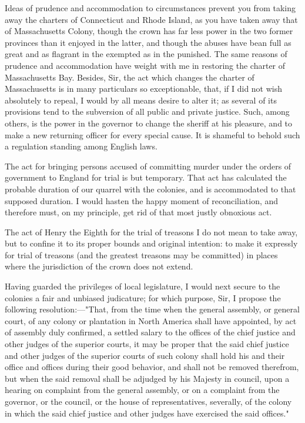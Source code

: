 Ideas of prudence and accommodation to circumstances prevent you from taking away the charters of Connecticut and Rhode Island, as you have taken away that of Massachusetts Colony, though the crown has far less power in the two former provinces than it enjoyed in the latter, and though the abuses have bean full as great and as flagrant in the exempted as in the punished. The same reasons of prudence and accommodation have weight with me in restoring the charter of Massachusetts Bay. Besides, Sir, the act which changes the charter of Massachusetts is in many particulars so exceptionable, that, if I did not wish absolutely to repeal, I would by all means desire to alter it; as several of its provisions tend to the subversion of all public and private justice. Such, among others, is the power in the governor to change the sheriff at his pleasure, and to make a new returning officer for every special cause. It is shameful to behold such a regulation standing among English laws.

The act for bringing persons accused of committing murder under the orders of government to England for trial is but temporary. That act has calculated the probable duration of our quarrel with the colonies, and is accommodated to that supposed duration. I would hasten the happy moment of reconciliation, and therefore must, on my principle, get rid of that most justly obnoxious act.

The act of Henry the Eighth for the trial of treasons I do not mean to take away, but to confine it to its proper bounds and original intention: to make it expressly for trial of treasons (and the greatest treasons may be committed) in places where the jurisdiction of the crown does not extend.

Having guarded the privileges of local legislature, I would next secure to the colonies a fair and unbiased judicature; for which purpose, Sir, I propose the following resolution:—"That, from the time when the general assembly, or general court, of any colony or plantation in North America shall have appointed, by act of assembly duly confirmed, a settled salary to the offices of the chief justice and other judges of the superior courts, it may be proper that the said chief justice and other judges of the superior courts of such colony shall hold his and their office and offices during their good behavior, and shall not be removed therefrom, but when the said removal shall be adjudged by his Majesty in council, upon a hearing on complaint from the general assembly, or on a complaint from the governor, or the council, or the house of representatives, severally, of the colony in which the said chief justice and other judges have exercised the said offices."

